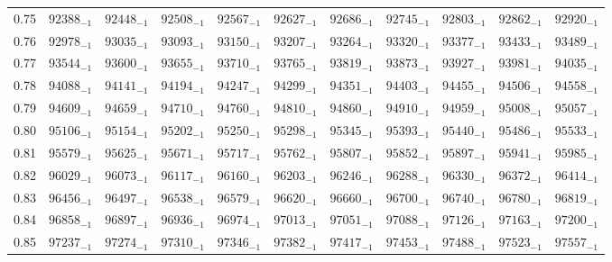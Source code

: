 \documentclass[10pt, a4paper]{article}
\begin{document}
\begin{center}
\begin{longtable}{c || c c c c c | c c c c c}
        0.75 & \({92388}_{-1}\) & \({92448}_{-1}\) & \({92508}_{-1}\) & \({92567}_{-1}\) & \({92627}_{-1}\) & \({92686}_{-1}\) & \({92745}_{-1}\) & \({92803}_{-1}\) & \({92862}_{-1}\) & \({92920}_{-1}\)\\
        0.76 & \({92978}_{-1}\) & \({93035}_{-1}\) & \({93093}_{-1}\) & \({93150}_{-1}\) & \({93207}_{-1}\) & \({93264}_{-1}\) & \({93320}_{-1}\) & \({93377}_{-1}\) & \({93433}_{-1}\) & \({93489}_{-1}\)\\
        0.77 & \({93544}_{-1}\) & \({93600}_{-1}\) & \({93655}_{-1}\) & \({93710}_{-1}\) & \({93765}_{-1}\) & \({93819}_{-1}\) & \({93873}_{-1}\) & \({93927}_{-1}\) & \({93981}_{-1}\) & \({94035}_{-1}\)\\
        0.78 & \({94088}_{-1}\) & \({94141}_{-1}\) & \({94194}_{-1}\) & \({94247}_{-1}\) & \({94299}_{-1}\) & \({94351}_{-1}\) & \({94403}_{-1}\) & \({94455}_{-1}\) & \({94506}_{-1}\) & \({94558}_{-1}\)\\
        0.79 & \({94609}_{-1}\) & \({94659}_{-1}\) & \({94710}_{-1}\) & \({94760}_{-1}\) & \({94810}_{-1}\) & \({94860}_{-1}\) & \({94910}_{-1}\) & \({94959}_{-1}\) & \({95008}_{-1}\) & \({95057}_{-1}\)\\
        \hline
        0.80 & \({95106}_{-1}\) & \({95154}_{-1}\) & \({95202}_{-1}\) & \({95250}_{-1}\) & \({95298}_{-1}\) & \({95345}_{-1}\) & \({95393}_{-1}\) & \({95440}_{-1}\) & \({95486}_{-1}\) & \({95533}_{-1}\)\\
        0.81 & \({95579}_{-1}\) & \({95625}_{-1}\) & \({95671}_{-1}\) & \({95717}_{-1}\) & \({95762}_{-1}\) & \({95807}_{-1}\) & \({95852}_{-1}\) & \({95897}_{-1}\) & \({95941}_{-1}\) & \({95985}_{-1}\)\\
        0.82 & \({96029}_{-1}\) & \({96073}_{-1}\) & \({96117}_{-1}\) & \({96160}_{-1}\) & \({96203}_{-1}\) & \({96246}_{-1}\) & \({96288}_{-1}\) & \({96330}_{-1}\) & \({96372}_{-1}\) & \({96414}_{-1}\)\\
        0.83 & \({96456}_{-1}\) & \({96497}_{-1}\) & \({96538}_{-1}\) & \({96579}_{-1}\) & \({96620}_{-1}\) & \({96660}_{-1}\) & \({96700}_{-1}\) & \({96740}_{-1}\) & \({96780}_{-1}\) & \({96819}_{-1}\)\\
        0.84 & \({96858}_{-1}\) & \({96897}_{-1}\) & \({96936}_{-1}\) & \({96974}_{-1}\) & \({97013}_{-1}\) & \({97051}_{-1}\) & \({97088}_{-1}\) & \({97126}_{-1}\) & \({97163}_{-1}\) & \({97200}_{-1}\)\\
        0.85 & \({97237}_{-1}\) & \({97274}_{-1}\) & \({97310}_{-1}\) & \({97346}_{-1}\) & \({97382}_{-1}\) & \({97417}_{-1}\) & \({97453}_{-1}\) & \({97488}_{-1}\) & \({97523}_{-1}\) & \({97557}_{-1}\)\\

\end{longtable}
\end{center}
\end{document}
